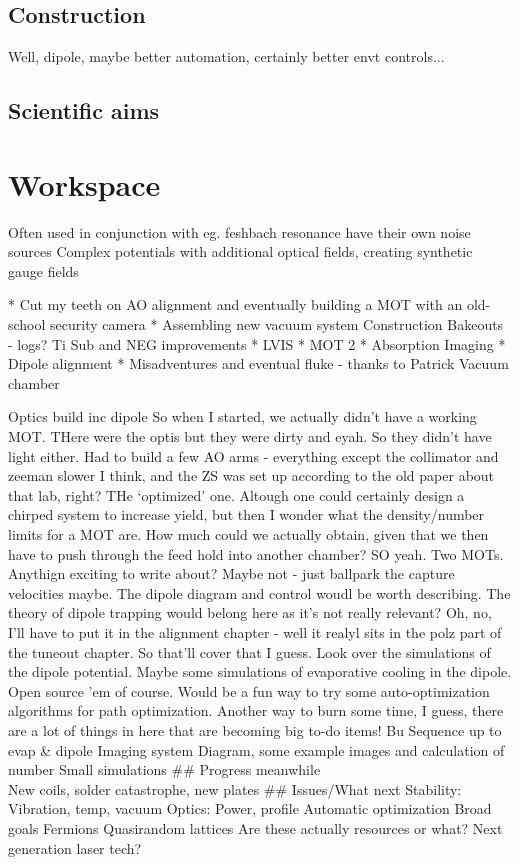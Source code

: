 \subsection*{Construction}

Well, dipole, maybe better automation, certainly better envt controls... 
\subsection*{Scientific aims}

\section*{Workspace}


		
	Often used in conjunction with eg. feshbach resonance 
	have their own noise sources
		\cite{pichler10}%
	Complex potentials with additional optical fields, creating synthetic gauge fields
		\cite{aidelsburger11,aidelsburger13,miyake13}


* Cut my teeth on AO alignment and eventually building
a MOT with an old-school security camera * Assembling new vacuum system
Construction Bakeouts - logs? Ti Sub and NEG improvements * LVIS * MOT 2
* Absorption Imaging * Dipole alignment * Misadventures and eventual
fluke - thanks to Patrick
Vacuum chamber

Optics build inc dipole So when I started, we actually didn't have a
working MOT. THere were the optis but they were dirty and eyah. So they
didn't have light either. Had to build a few AO arms - everything except
the collimator and zeeman slower I think, and the ZS was set up
according to the old paper about that lab, right? THe `optimized' one.
Altough one could certainly design a chirped system to increase yield,
but then I wonder what the density/number limits for a MOT are. How much
could we actually obtain, given that we then have to push through the
feed hold into another chamber? SO yeah. Two MOTs. Anythign exciting to
write about? Maybe not - just ballpark the capture velocities maybe. The
dipole diagram and control woudl be worth describing. The theory of
dipole trapping would belong here as it's not really relevant? Oh, no,
I'll have to put it in the alignment chapter - well it realyl sits in
the polz part of the tuneout chapter. So that'll cover that I guess.
Look over the simulations of the dipole potential. Maybe some
simulations of evaporative cooling in the dipole. Open source 'em of
course. Would be a fun way to try some auto-optimization algorithms for
path optimization. Another way to burn some time, I guess, there are a
lot of things in here that are becoming big to-do items! Bu Sequence up
to evap \& dipole Imaging system Diagram, some example images and
calculation of number Small simulations \#\# Progress meanwhile\\
New coils, solder catastrophe, new plates \#\# Issues/What next
Stability: Vibration, temp, vacuum Optics: Power, profile Automatic
optimization Broad goals Fermions Quasirandom lattices Are these
actually resources or what? Next generation laser tech?

